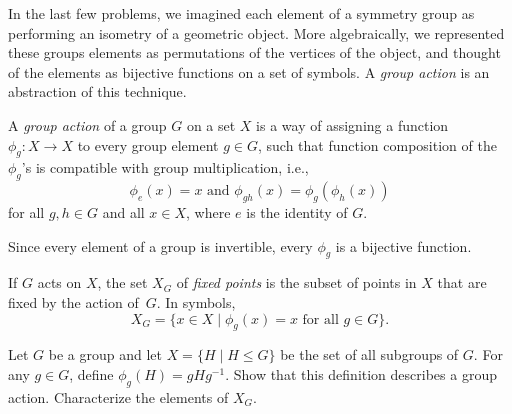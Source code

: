 In the last few problems, we imagined each element of a symmetry group as performing an isometry of a geometric object. More algebraically, we represented these groups elements as permutations of the vertices of the object, and thought of the elements as bijective functions on a set of symbols. A \textit{group action} is an abstraction of this technique.

\begin{definition}\label{def:groupaction}
A \emph{group action} of a group $G$ on a set $X$ is a way of assigning a function $\phi_g : X \longrightarrow X$ to every group element $g \in G$, such that function composition of the $\phi_g$'s is compatible with group multiplication, i.e.,
$$\phi_e(x) = x \mbox{ and }\phi_{gh}(x) = \phi_g(\phi_h(x))$$
for all $g,h \in G$ and all $x\in X$, where $e$ is the identity of $G$.
\begin{annotation}
\end{annotation}
\end{definition}

Since every element of a group is invertible, every $\phi_g$ is a bijective function.
\begin{annotation}
\end{annotation}

\begin{definition}
 If $G$ acts on $X$, the set $X_G$ of \emph{fixed points} is the subset of points in $X$ that are fixed by the action of~$G$. In symbols, $$X_G =\{ x \in X \mid \phi_g(x) = x \mbox{ for all } g \in G \}.$$
\end{definition}

\begin{problem}
Let $G$ be a group and let $X = \{ H \mid H \leq G\}$ be the set of all subgroups of $G$.  For any $g \in G$, define $\phi_g(H) = gHg^{-1}$.  Show that this definition describes a group action.  Characterize the elements of $X_G$.
\end{problem}

